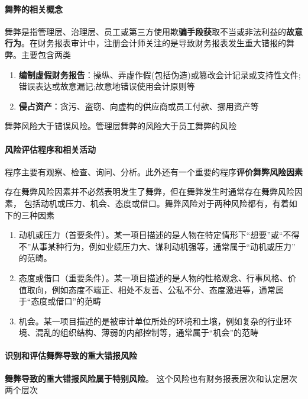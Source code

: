 \documentclass[UTF8,12pt]{ctexart}
\numberwithin{equation}{section} %
\numberwithin{figure}{section}
\numberwithin{table}{section}
\begin{document}
	\paragraph{舞弊的相关概念}
	舞弊是指管理层、治理层、员工或第三方使用欺\textbf{骗手段获}取不当或非法利益的\textbf{故意行为}。在财务报表审计中，注册会计师关注的是导致财务报表发生重大错报的舞弊。主要包含两类
	\begin{enumerate}
		\item \textbf{编制虚假财务报告}：操纵、弄虚作假(包括伪造)或篡改会计记录或支持性文件; 错误表达或故意漏记;故意地错误使用会计原则等
		
		\item \textbf{侵占资产}：贪污、盗窃、向虚构的供应商或员工付款、挪用资产等
	\end{enumerate}
	
	舞弊风险大于错误风险。管理层舞弊的风险大于员工舞弊的风险
	
	\paragraph{风险评估程序和相关活动}
	程序主要有观察、检查、询问、分析。此外还有一个重要的程序\textbf{评价舞弊风险因素}
	
	存在舞弊风险因素并不必然表明发生了舞弊，但在舞弊发生时通常存在舞弊风险因素， 包括动机或压力、机会、态度或借口。舞弊风险对于两种风险都有，有着如下的三种因素
	\begin{enumerate}
		\item 动机或压力（首要条件）。某一项目描述的是人物在特定情形下“想要”或“不得不”从事某种行为，例如业绩压力大、谋利动机强等，通常属于“动机或压力” 的范畴。
		
		\item 态度或借口（重要条件）。某一项目描述的是人物的性格观念、行事风格、价值取向，例如态度不端正、相处不友善、公私不分、态度激进等，通常属于“态度或借口”的范畴
		
		\item 机会。某一项目描述的是被审计单位所处的环境和土壤，例如复杂的行业环境、混乱的组织结构、薄弱的内部控制等，通常属于“机会”的范畴
	\end{enumerate}
	
	\paragraph{识别和评估舞弊导致的重大错报风险}
	
	\textbf{舞弊导致的重大错报风险属于特别风险}。 这个风险也有财务报表层次和认定层次两个层次
	
\end{document}
